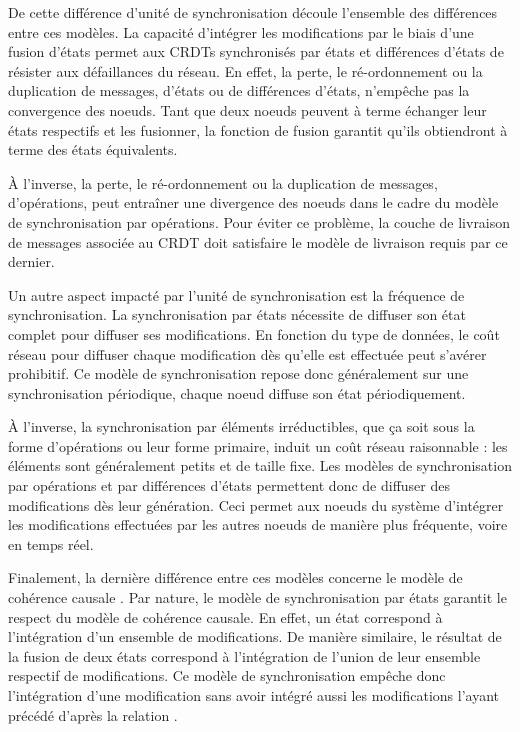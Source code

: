 De cette différence d'unité de synchronisation découle l'ensemble des différences entre ces modèles.
La capacité d'intégrer les modifications par le biais d'une fusion d'états permet aux \acp{CRDT} synchronisés par états et différences d'états de résister aux défaillances du réseau.
En effet, la perte, le ré-ordonnement ou la duplication de messages, \ie d'états ou de différences d'états, n'empêche pas la convergence des noeuds.
Tant que deux noeuds peuvent à terme échanger leur états respectifs et les fusionner, la fonction de fusion garantit qu'ils obtiendront à terme des états équivalents.

À l'inverse, la perte, le ré-ordonnement ou la duplication de messages, \ie d'opérations, peut entraîner une divergence des noeuds dans le cadre du modèle de synchronisation par opérations.
Pour éviter ce problème, la couche de livraison de messages associée au \ac{CRDT} doit satisfaire le modèle de livraison requis par ce dernier.

Un autre aspect impacté par l'unité de synchronisation est la fréquence de synchronisation.
La synchronisation par états nécessite de diffuser son état complet pour diffuser ses modifications.
En fonction du type de données, le coût réseau pour diffuser chaque modification dès qu'elle est effectuée peut s'avérer prohibitif.
Ce modèle de synchronisation repose donc généralement sur une synchronisation périodique, \ie chaque noeud diffuse son état périodiquement.

À l'inverse, la synchronisation par éléments irréductibles, que ça soit sous la forme d'opérations ou leur forme primaire, induit un coût réseau raisonnable : les éléments sont généralement petits et de taille fixe.
Les modèles de synchronisation par opérations et par différences d'états permettent donc de diffuser des modifications dès leur génération.
Ceci permet aux noeuds du système d'intégrer les modifications effectuées par les autres noeuds de manière plus fréquente, voire en temps réel.

Finalement, la dernière différence entre ces modèles concerne le modèle de cohérence causale .
Par nature, le modèle de synchronisation par états garantit le respect du modèle de cohérence causale.
En effet, un état correspond à l'intégration d'un ensemble de modifications.
De manière similaire, le résultat de la fusion de deux états correspond à l'intégration de l'union de leur ensemble respectif de modifications.
Ce modèle de synchronisation empêche donc l'intégration d'une modification sans avoir intégré aussi les modifications l'ayant précédé d'après la relation \hb.


